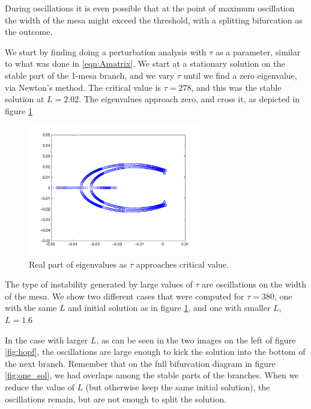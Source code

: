 \documentclass[a4paper,10pt]{article}
\begin{document}
During oscillations it is even possible that at the point of maximum oscillation the width of the mesa might exceed the threshold, with a splitting bifurcation as the outcome.

We start by finding doing a perturbation analysis with $\tau$ as a parameter, similar to what was done in \eqref{eqn:Amatrix}. We start at a stationary solution on the stable part of the 1-mesa branch, and we vary $\tau$ until we find a zero eigenvalue, via Newton's method. The critical value is $\tau=278$, and this was the stable solution at $L=2.02$. The eigenvalues approach zero, and cross it, as depicted in figure \ref{fig:eigs2}

% 
\begin{figure}[htb]
\begin{center}
\includegraphics[width=3in]{eigenvalue_tau}
\caption{Real part of eigenvalues as $\tau$ approaches critical value.}
\label{fig:eigs2}
\end{center}
\end{figure}
% 

The type of instability generated by large values of $\tau$ are oscillations on the width of the mesa. We show two different cases that were computed for $\tau=380$, one with the same $L$ and initial solution as in figure \ref{fig:eigs2}, and one with smaller $L$, $L=1.6$

In the case with larger $L$, as can be seen in the two images on the left of figure \ref{fig:hopf}, the oscillations are large enough to kick the solution into the bottom of the next branch. Remember that on the full bifurcation diagram in figure \ref{fig:one_sol}, we had overlaps among the stable parts of the branches. When we reduce the value of $L$ (but otherwise keep the same initial solution), the oscillations remain, but are not enough to split the solution.
\end{document}
